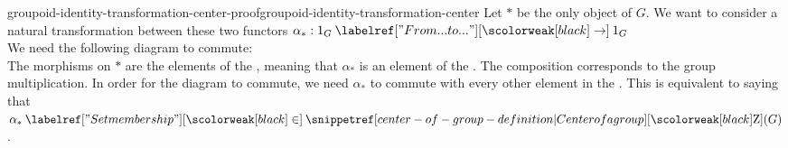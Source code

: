 \documentclass[preview]{standalone}
\begin{document}
\begin{snippetproof}{groupoid-identity-transformation-center-proof}{groupoid-identity-transformation-center}{}
    Let \(\ast\) be the only object of \(G\).
    We want to consider a natural transformation between
    these two functors \(\alpha_\ast: 1_G \fromto 1_G\) \\
    We need the following diagram to commute: \\
    The morphisms on \(\ast\) are the elements of the \group, meaning that
    \(\alpha_\ast\) is an element of the \group.
    The composition corresponds to the group multiplication.
    In order for the diagram to commute, we need \(\alpha_\ast\)
    to commute with every other element in the \group.
    This is equivalent to saying that \(\alpha_\ast \in \groupcenter(G)\).
\end{snippetproof}
\end{document}
